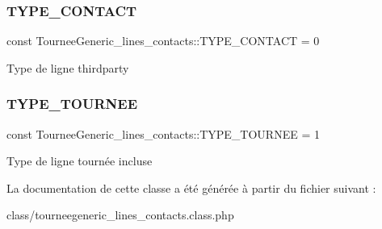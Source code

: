 \subsubsection{\texorpdfstring{T\+Y\+P\+E\+\_\+\+C\+O\+N\+T\+A\+CT}{TYPE\_CONTACT}}
{\footnotesize\ttfamily const Tournee\+Generic\+\_\+lines\+\_\+contacts\+::\+T\+Y\+P\+E\+\_\+\+C\+O\+N\+T\+A\+CT = 0}

Type de ligne thirdparty \mbox{\label{classTourneeGeneric__lines__contacts_a7d515f55057e1057cf59f58be806d895}} 
\subsubsection{\texorpdfstring{T\+Y\+P\+E\+\_\+\+T\+O\+U\+R\+N\+EE}{TYPE\_TOURNEE}}
{\footnotesize\ttfamily const Tournee\+Generic\+\_\+lines\+\_\+contacts\+::\+T\+Y\+P\+E\+\_\+\+T\+O\+U\+R\+N\+EE = 1}

Type de ligne tournée incluse 

La documentation de cette classe a été générée à partir du fichier suivant \+:\begin{DoxyCompactItemize}
\item 
class/tourneegeneric\+\_\+lines\+\_\+contacts.\+class.\+php\end{DoxyCompactItemize}
